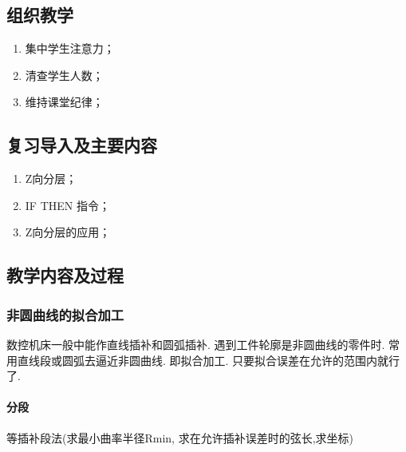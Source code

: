 \jxhj{%
	}

\makeshouye %

\subsection{组织教学}
\begin{enumerate}[\hspace{2em}1、]
	\item 集中学生注意力；
	\item 清查学生人数；
	\item 维持课堂纪律；
\end{enumerate}
\subsection{复习导入及主要内容}
\begin{enumerate}[\hspace{2em}1、]
\item Z向分层；
\item IF THEN 指令；
\item Z向分层的应用；
\end{enumerate}
\subsection{教学内容及过程}
\subsubsection{非圆曲线的拟合加工} %
 数控机床一般中能作直线插补和圆弧插补. 遇到工件轮廓是非圆曲线的零件时. 常用直线段或圆弧去逼近非圆曲线. 即拟合加工. 只要拟合误差在允许的范围内就行了.
 
 \paragraph{分段}
 等插补段法(求最小曲率半径Rmin, 求在允许插补误差时的弦长,求坐标)
 
